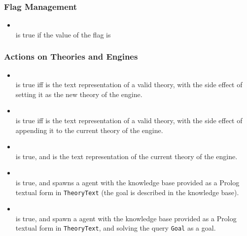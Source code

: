 \subsubsection{Flag Management}
\begin{itemize}
%
\item {}\\
\noindent{} is true if the
value of the flag 
is \\
%
\end{itemize}

\subsubsection{Actions on Theories and Engines}
\begin{itemize}
%
%
\item {}\\
\noindent{} is true iff 
is the text representation of a valid \tuprolog{} theory, with the
side effect of setting it as the new theory of the engine.\\
%
\item {}\\
\noindent{} is true iff 
is the text representation of a valid \tuprolog{} theory, with the
side effect of appending it to the current theory of the engine.\\
%
\item {}\\
\noindent{} is true, and
 is the text representation of the current theory of the engine.\\
%
\item {}\\
\noindent{} is true, and spawns a
\tuprolog{} agent with the knowledge base provided as a Prolog
textual form in \texttt{TheoryText} (the goal is described in the
knowledge base).\\
%
\item {}\\
\noindent{} is true, and spawn a
\tuprolog{} agent with the knowledge base provided as a Prolog
textual form in \texttt{TheoryText}, and solving the query
\texttt{Goal}
as a goal.\\
%
\end{itemize}
%
